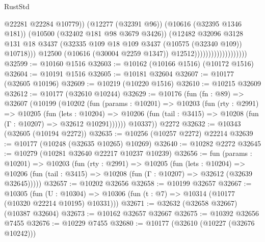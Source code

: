\begin{lexlean}{RustStd}
\begin{coremodule}
                                                @22281
                                                @22284
                                                @10779))
                                            (@12277 (@32391 @96))
                                            (@10616 (@32395 @1346 @181))
                                            (@10500 (@32402 @181 @98 @3679 @3426))
                                            (@12482
                                              @32096
                                              @3128
                                              @131
                                              @18
                                              @3437
                                              (@32335
                                                @109
                                                @18
                                                @109
                                                @3437
                                                (@10575 (@32340 @109))
                                                @10718)))
                                          @12500
                                          (@10616 (@30004 @2259 @1347))
                                          @12512)))))))))))))))))))
@32599 := @10160 @1516
@32603 := @10162 (@10166 @1516) (@10172 @1516)
@32604 := @10191 @1516
@32605 := @10181 @32604
@32607 := @10177 (@32605 @10196)
@32609 := @10219 (@10220 @1516)
@32610 := @10215 @32609
@32612 := @10177 (@32610 @10244)
@32629 := @10176
    (fun (fn : @89) =>
    @32607
      (@10199
        (@10202
          (fun (params : @10201) =>
          @10203
            (fun (rty : @2991) =>
            @10205
              (fun (lets : @10204) =>
              @10206 (fun (tail : @3415) => @10208 (fun (Γ : @10207) => @32612 @10291))))))
        @10337))
    @2272
@32632 := @10343 (@32605 (@10194 @2272))
@32635 := @10256 (@10257 @2272) @22214
@32639 := @10177 (@10248 (@32635 @10265) @10269)
@32640 := @10282 @2272
@32645 := @10279 (@10281 @32640 @22217 @10237 @10239)
@32656 := fun (params : @10201) =>
  @10203
    (fun (rty : @2991) =>
    @10205
      (fun (lets : @10204) =>
      @10206 (fun (tail : @3415) => @10208 (fun (Γ : @10207) => @32612 (@32639 @32645)))))
@32657 := @10202 @32656
@32658 := @10199 @32657
@32667 := @10305
    (fun (U : @10304) => @10306 (fun (t : @7) => @10314 (@10177 (@10320 @22214 @10195) @10331)))
@32671 := @32632 (@32658 @32667) (@10387 @32604)
@32673 := @10162 @32657 @32667
@32675 := @10392 @32656 @7455
@32676 := @10229 @7455
@32680 := @10177 (@32610 (@10227 (@32676 @10242)))

\end{coremodule}
\end{lexlean}
